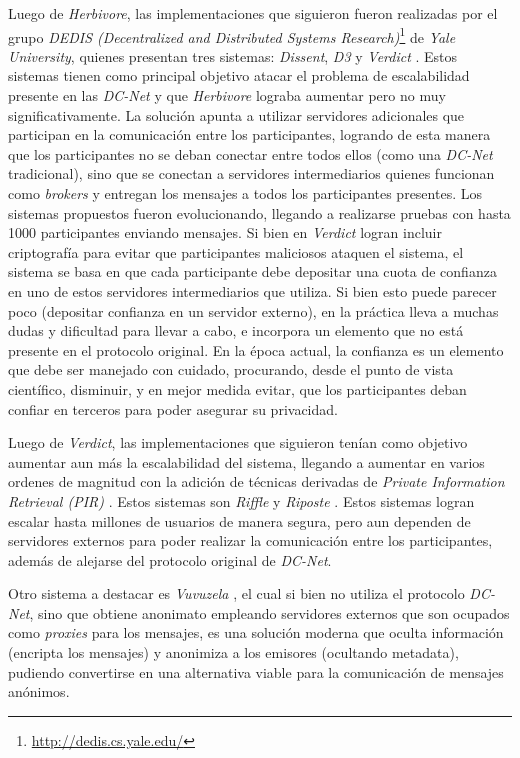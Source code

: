 Luego de \emph{Herbivore}, las implementaciones que siguieron fueron 
realizadas por el grupo \emph{DEDIS (Decentralized and Distributed Systems 
Research)}\footnote{\url{http://dedis.cs.yale.edu/}} 
de \emph{Yale University}, 
quienes presentan tres sistemas: \emph{Dissent}, \emph{D3} y \emph{Verdict} 
\cite{corrigan2010dissent, wolinsky2012dissent, wolinsky2012scalable, 
corrigan2012proactively}. Estos sistemas tienen como principal 
objetivo atacar el problema de escalabilidad presente en las \emph{DC-Net} y 
que \emph{Herbivore} lograba aumentar pero no muy 
significativamente. La solución apunta a utilizar servidores adicionales que 
participan en la comunicación entre los participantes, logrando de esta manera 
que los participantes no se deban conectar entre todos ellos (como una 
\emph{DC-Net} tradicional), sino que se conectan a servidores intermediarios 
quienes funcionan como \emph{brokers} y entregan los mensajes a todos los 
participantes presentes. Los sistemas propuestos fueron evolucionando, 
llegando a realizarse pruebas con hasta 1000 participantes enviando mensajes. 
Si bien en \emph{Verdict} logran incluir criptografía para evitar 
que participantes maliciosos ataquen el sistema, el sistema se basa en que 
cada participante debe depositar una cuota de confianza en uno de estos 
servidores intermediarios que utiliza. Si bien esto puede parecer poco 
(depositar confianza en un servidor externo), en la práctica lleva a muchas 
dudas y dificultad para llevar a cabo, e incorpora un elemento que no está 
presente en el protocolo original. En la época actual, la confianza es un 
elemento que debe ser manejado con cuidado, procurando, 
desde el punto de vista científico, disminuir, y en mejor medida evitar, que 
los participantes deban confiar en terceros para poder asegurar su privacidad. 

Luego de \emph{Verdict}, las implementaciones que siguieron tenían como 
objetivo aumentar aun más la escalabilidad del sistema, llegando a aumentar en 
varios ordenes de magnitud con la adición de técnicas derivadas de 
\emph{Private Information Retrieval (PIR)} 
\cite{chor1995private}. Estos sistemas son \emph{Riffle} \cite{kwon2016riffle} 
y \emph{Riposte} \cite{corrigan2015riposte}. Estos sistemas logran escalar 
hasta millones de usuarios de manera segura, pero aun dependen de servidores 
externos para poder realizar la comunicación entre los participantes, además 
de alejarse del protocolo original de \emph{DC-Net}.

Otro sistema a destacar es \emph{Vuvuzela} \cite{van2015vuvuzela}, el cual si 
bien no utiliza el protocolo \emph{DC-Net}, sino que obtiene anonimato 
empleando servidores externos que son ocupados como \emph{proxies} para los 
mensajes, es una solución moderna que oculta información (encripta los 
mensajes) y anonimiza a los emisores (ocultando metadata), pudiendo 
convertirse en una alternativa viable para la comunicación de mensajes 
anónimos.

